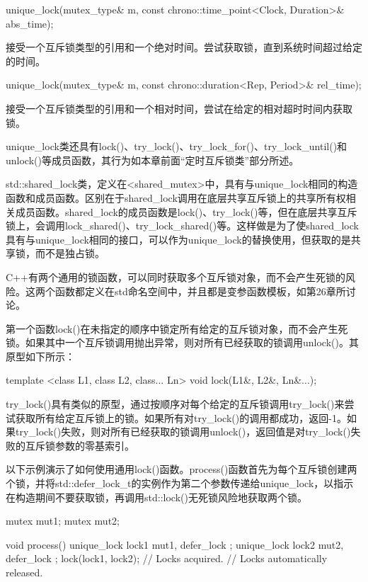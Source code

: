 \begin{cpp}
unique_lock(mutex_type& m, const chrono::time_point<Clock, Duration>& abs_time);
\end{cpp}

接受一个互斥锁类型的引用和一个绝对时间。尝试获取锁，直到系统时间超过给定的时间。

\begin{cpp}
unique_lock(mutex_type& m, const chrono::duration<Rep, Period>& rel_time);
\end{cpp}

接受一个互斥锁类型的引用和一个相对时间，尝试在给定的相对超时时间内获取锁。

unique\_lock类还具有lock()、try\_lock()、try\_lock\_for()、try\_lock\_until()和unlock()等成员函数，其行为如本章前面“定时互斥锁类”部分所述。


std::shared\_lock类，定义在<shared\_mutex>中，具有与unique\_lock相同的构造函数和成员函数。区别在于shared\_lock调用在底层共享互斥锁上的共享所有权相关成员函数。shared\_lock的成员函数是lock()、try\_lock()等，但在底层共享互斥锁上，会调用lock\_shared()、try\_lock\_shared()等。这样做是为了使shared\_lock具有与unique\_lock相同的接口，可以作为unique\_lock的替换使用，但获取的是共享锁，而不是独占锁。


C++有两个通用的锁函数，可以同时获取多个互斥锁对象，而不会产生死锁的风险。这两个函数都定义在std命名空间中，并且都是变参函数模板，如第26章所讨论。

第一个函数lock()在未指定的顺序中锁定所有给定的互斥锁对象，而不会产生死锁。如果其中一个互斥锁调用抛出异常，则对所有已经获取的锁调用unlock()。其原型如下所示：

\begin{cpp}
template <class L1, class L2, class... Ln> void lock(L1&, L2&, Ln&...);
\end{cpp}

try\_lock()具有类似的原型，通过按顺序对每个给定的互斥锁调用try\_lock()来尝试获取所有给定互斥锁上的锁。如果所有对try\_lock()的调用都成功，返回-1。如果try\_lock()失败，则对所有已经获取的锁调用unlock()，返回值是对try\_lock()失败的互斥锁参数的零基索引。

以下示例演示了如何使用通用lock()函数。process()函数首先为每个互斥锁创建两个锁，并将std::defer\_lock\_t的实例作为第二个参数传递给unique\_lock，以指示在构造期间不要获取锁，再调用std::lock()无死锁风险地获取两个锁。

\begin{cpp}
mutex mut1;
mutex mut2;

void process()
{
    unique_lock lock1 { mut1, defer_lock };
    unique_lock lock2 { mut2, defer_lock };
    lock(lock1, lock2);
    // Locks acquired.
} // Locks automatically released.
\end{cpp}

